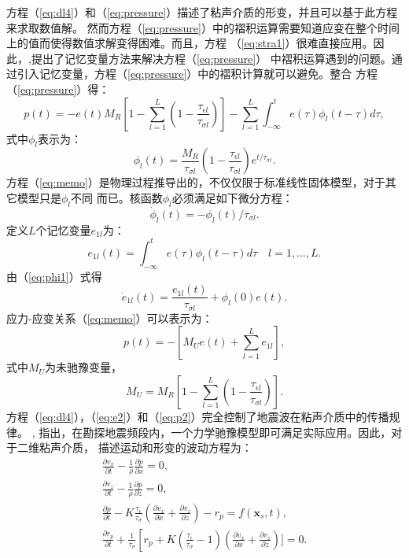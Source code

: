方程（\ref{eq:dl4}）和（\ref{eq:pressure}）描述了粘声介质的形变，并且可以基于此方程来求取数值解。
然而方程（\ref{eq:pressure}）中的褶积运算需要知道应变在整个时间上的值而使得数值求解变得困难。而且，方程
（\ref{eq:stra1}）很难直接应用。因此，,提出了记忆变量方法来解决方程（\ref{eq:pressure}）
中褶积运算遇到的问题。通过引入记忆变量，方程（\ref{eq:pressure}）中的褶积计算就可以避免。整合
方程（\ref{eq:pressure}）得：
\begin{equation}
	p(t)=-e(t)M_R[1-\sum_{l=1}^L(1-\frac{\tau_{\epsilon l}}{\tau_{\sigma l}})]-
	\sum_{l=1}^L\int_{-\infty}^{t}e(\tau)\phi_l(t-\tau)d\tau,
	\label{eq:memo}
\end{equation}
式中$\phi_l$表示为：
\begin{equation}
	\phi_l(t)=\frac{M_R}{\tau_{\sigma l}}(1-\frac{\tau_{\epsilon l}}{\tau_{\sigma l}})e^{t/\tau_{\sigma l}}.
	\label{eq:phi1}
\end{equation}
方程（\ref{eq:memo}）是物理过程推导出的，不仅仅限于标准线性固体模型，对于其它模型只是$\phi_l$不同
而已。核函数$\phi_l$必须满足如下微分方程：
\begin{equation}
	\dot{\phi}_l(t)=-\phi_l(t)/\tau_{\sigma l}.
	\label{eq:phi2}
\end{equation}
定义$L$个记忆变量$e_{1l}$为：
\begin{equation}
	e_{1l}(t)=\int^t_{-\infty}e(\tau)\phi_l(t-\tau)d\tau \quad l=1,\dots,L.
\end{equation}
由（\ref{eq:phi1}）式得
\begin{equation}
	\dot{e}_{1l}(t)=\frac{e_{1l}(t)}{\tau_{\sigma l}}+\phi_l(0)e(t).
	\label{eq:e2}
\end{equation}
应力-应变关系（\ref{eq:memo}）可以表示为：
\begin{equation}
	p(t)=-[M_Ue(t)+\sum_{l=1}^Le_{1l}],
	\label{eq:p2}
\end{equation}
式中$M_U$为未驰豫变量，
\begin{equation}
	M_U=M_R[1-\sum_{l=1}^L(1-\frac{\tau_{\epsilon l}}{\tau_{\sigma l}})].
\end{equation}
方程（\ref{eq:dl4}），（\ref{eq:e2}）和（\ref{eq:p2}）完全控制了地震波在粘声介质中的传播规律。
, 指出，在勘探地震频段内，一个力学驰豫模型即可满足实际应用。因此，对于二维粘声介质，
描述运动和形变的波动方程为：
\begin{equation}
    \begin{aligned}
    \label{eq:visco}
    \frac{\partial v_x}{\partial t} - \frac{1}{\rho}\frac{\partial p}{\partial x}=0,\\
    \frac{\partial v_z}{\partial t} - \frac{1}{\rho}\frac{\partial p}{\partial z}=0,\\
    \frac{\partial p}{\partial t} -
    K\frac{\tau_\epsilon}{\tau_\sigma}(\frac{\partial v_x}{\partial x}+\frac{\partial v_z}{\partial z})-r_p=f(\mathbf{x}_s,t),
    \\
    \frac{\partial{r_p}}{\partial t} +
    \frac{1}{\tau_\sigma}\left[r_p+K(\frac{\tau_\epsilon}{\tau_\sigma}-1)
	(\frac{\partial v_x}{\partial x}+\frac{\partial v_z}{\partial z})]=0.
    \end{aligned}
\end{equation}
